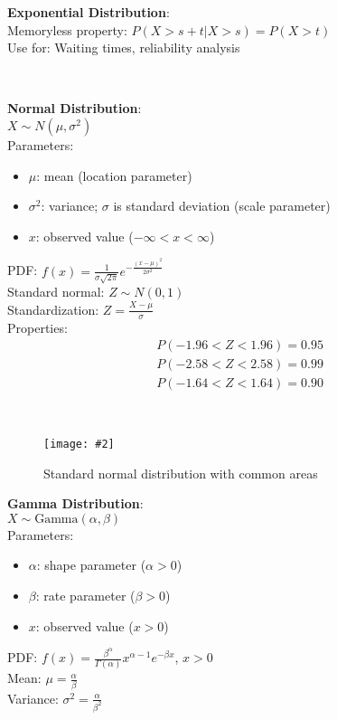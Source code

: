 \documentclass{article}
\def\imagewidth{0.9}
\newenvironment{cheatformula}[1][Title]{
    \begin{minipage}{\linewidth}
    \textbf{#1}:\\
}{
    \end{minipage}\\[2ex]
}
\newcommand{\cheatimage}[4][\imagewidth]{
    \begin{figure}[H]
        \centering
        \texttt{[image: \#2]}
        \caption{#3}
        \label{#4}
    \end{figure}
}
\begin{document}
\begin{multicols*}{2}
\begin{cheatformula}[Exponential Distribution]
    Memoryless property: $P(X > s+t | X > s) = P(X > t)$\\
    Use for: Waiting times, reliability analysis
\end{cheatformula}

\begin{cheatformula}[Normal Distribution]
    $X \sim N(\mu, \sigma^2)$\\
    Parameters:
    \begin{itemize}
        \item $\mu$: mean (location parameter)
        \item $\sigma^2$: variance; $\sigma$ is standard deviation (scale parameter)
        \item $x$: observed value ($-\infty < x < \infty$)
    \end{itemize}
    PDF: $f(x) = \frac{1}{\sigma\sqrt{2\pi}}e^{-\frac{(x-\mu)^2}{2\sigma^2}}$\\
    
    Standard normal: $Z \sim N(0,1)$\\
    Standardization: $Z = \frac{X-\mu}{\sigma}$\\
    
    Properties:
    \begin{align*}
        &P(-1.96 < Z < 1.96) = 0.95\\
        &P(-2.58 < Z < 2.58) = 0.99\\
        &P(-1.64 < Z < 1.64) = 0.90
    \end{align*}
\end{cheatformula}

\cheatimage[1.0]{standard_normal_distribution.png}{Standard normal distribution with common areas}{fig:standard-normal}

\begin{cheatformula}[Gamma Distribution]
    $X \sim \text{Gamma}(\alpha, \beta)$\\
    Parameters:
    \begin{itemize}
        \item $\alpha$: shape parameter ($\alpha > 0$)
        \item $\beta$: rate parameter ($\beta > 0$)
        \item $x$: observed value ($x > 0$)
    \end{itemize}
    PDF: $f(x) = \frac{\beta^\alpha}{\Gamma(\alpha)}x^{\alpha-1}e^{-\beta x}$, $x > 0$\\
    Mean: $\mu = \frac{\alpha}{\beta}$\\
    Variance: $\sigma^2 = \frac{\alpha}{\beta^2}$\\
    

\end{cheatformula}
\end{multicols*}
\end{document}

